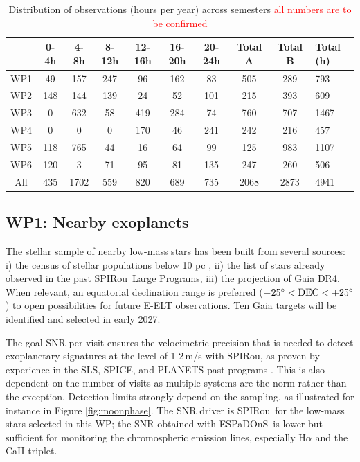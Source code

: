 \documentclass[
    traditabstract,
    longauth,
    onecolumn,
]{aa}
\def \spi{SPIRou}
\def \esp{ESPaDOnS}
\begin{document}
\begin{table}[b]
    \centering
    \begin{tabular}{c|cccccc|cc|l}
            & 0-4h & 4-8h & 8-12h & 12-16h & 16-20h & 20-24h & Total A & Total B & Total (h) \\\hline
        WP1 & 49   & 157  & 247   &  96    & 162    & 83     & 505 & 289 & 793     \\
        WP2 &  148 &  144 & 139   &  24    &  52    &  101   & 215 & 393 &  609 \\
        WP3 & 0    & 632  &  58   &  419   &  284   & 74     & 760 & 707 &  1467 \\
        WP4 & 0    &   0  &   0   & 170    &  46    & 241    & 242 & 216 & 457  \\
        WP5 & 118  &  765 &  44   & 16     & 64     & 99     & 125 & 983 & 1107 \\
        WP6 & 120  &  3   &  71   & 95     & 81     &  135   & 247 & 260 & 506  \\\hline
        All & 435  &  1702&  559  & 820    & 689    & 735   & 2068 & 2873 & 4941  \\
    \end{tabular}
    \caption{Distribution of observations (hours per year) across semesters \textcolor{red}{all numbers are to be confirmed}}
    \label{tab:RA}
\end{table}


\newpage
\subsection{WP1: Nearby exoplanets}
The stellar sample of nearby low-mass stars has been built from several sources: i) the census of stellar populations below 10 pc \citep{reyle_10_2021}, ii) the list of stars already observed in the past \spi\ Large Programs, iii) the projection of Gaia DR4. When relevant, an equatorial declination range is preferred ($-25^\circ < \rm DEC < +25^\circ$) to open possibilities for future E-ELT observations. Ten Gaia targets will be identified and selected in early 2027.

The goal SNR per visit ensures the velocimetric precision that is needed to detect exoplanetary signatures at the level of 1-2\,m/s with SPIRou, as proven by experience in the SLS, SPICE, and PLANETS past programs \citep{moutou_characterizing_2023, ouldelhkim2026}. This is also dependent on the number of visits \citep{carmona2025} as multiple systems are the norm rather than the exception. Detection limits strongly depend on the sampling, as illustrated for instance in Figure \ref{fig:moonphase}. The SNR driver is \spi\ for the low-mass stars selected in this WP; the SNR obtained with \esp\ is lower but sufficient for monitoring the chromospheric emission lines, especially H$\alpha$ and the CaII triplet.
\end{document}

